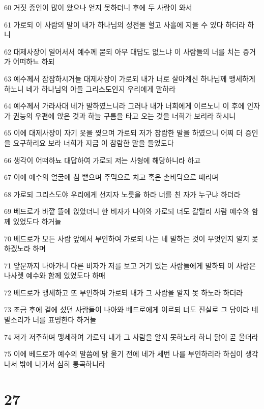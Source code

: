 \par 60 거짓 증인이 많이 왔으나 얻지 못하더니 후에 두 사람이 와서
\par 61 가로되 이 사람의 말이 내가 하나님의 성전을 헐고 사흘에 지을 수 있다 하더라 하니
\par 62 대제사장이 일어서서 예수께 묻되 아무 대답도 없느냐 이 사람들의 너를 치는 증거가 어떠하뇨 하되
\par 63 예수께서 잠잠하시거늘 대제사장이 가로되 내가 너로 살아계신 하나님께 맹세하게 하노니 네가 하나님의 아들 그리스도인지 우리에게 말하라
\par 64 예수께서 가라사대 네가 말하였느니라 그러나 내가 너희에게 이르노니 이 후에 인자가 권능의 우편에 앉은 것과 하늘 구름을 타고 오는 것을 너희가 보리라 하시니
\par 65 이에 대제사장이 자기 옷을 찢으며 가로되 저가 참람한 말을 하였으니 어찌 더 증인을 요구하리요 보라 너희가 지금 이 참람한 말을 들었도다
\par 66 생각이 어떠하뇨 대답하여 가로되 저는 사형에 해당하니라 하고
\par 67 이에 예수의 얼굴에 침 뱉으며 주먹으로 치고 혹은 손바닥으로 때리며
\par 68 가로되 그리스도야 우리에게 선지자 노릇을 하라 너를 친 자가 누구냐 하더라
\par 69 베드로가 바깥 뜰에 앉았더니 한 비자가 나아와 가로되 너도 갈릴리 사람 예수와 함께 있었도다 하거늘
\par 70 베드로가 모든 사람 앞에서 부인하여 가로되 나는 네 말하는 것이 무엇인지 알지 못하겠노라 하며
\par 71 앞문까지 나아가니 다른 비자가 저를 보고 거기 있는 사람들에게 말하되 이 사람은 나사렛 예수와 함께 있었도다 하매
\par 72 베드로가 맹세하고 또 부인하여 가로되 내가 그 사람을 알지 못 하노라 하더라
\par 73 조금 후에 곁에 섰던 사람들이 나아와 베드로에게 이르되 너도 진실로 그 당이라 네 말소리가 너를 표명한다 하거늘
\par 74 저가 저주하며 맹세하여 가로되 내가 그 사람을 알지 못하노라 하니 닭이 곧 울더라
\par 75 이에 베드로가 예수의 말씀에 닭 울기 전에 네가 세번 나를 부인하리라 하심이 생각나서 밖에 나가서 심히 통곡하니라

\chapter{27}


